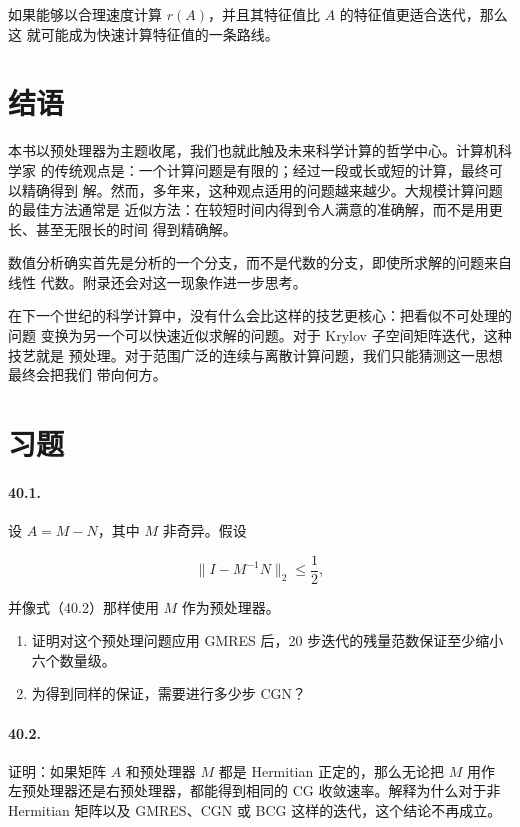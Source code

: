 \documentclass[UTF8,fontset=none,12pt]{ctexart}
\begin{document}
如果能够以合理速度计算 $r(A)$，并且其特征值比 $A$ 的特征值更适合迭代，那么这
就可能成为快速计算特征值的一条路线。

\section*{结语}

本书以预处理器为主题收尾，我们也就此触及未来科学计算的哲学中心。计算机科学家
的传统观点是：一个计算问题是有限的；经过一段或长或短的计算，最终可以精确得到
解。然而，多年来，这种观点适用的问题越来越少。大规模计算问题的最佳方法通常是
近似方法：在较短时间内得到令人满意的准确解，而不是用更长、甚至无限长的时间
得到精确解。

数值分析确实首先是分析的一个分支，而不是代数的分支，即使所求解的问题来自线性
代数。附录还会对这一现象作进一步思考。

在下一个世纪的科学计算中，没有什么会比这样的技艺更核心：把看似不可处理的问题
变换为另一个可以快速近似求解的问题。对于 Krylov 子空间矩阵迭代，这种技艺就是
预处理。对于范围广泛的连续与离散计算问题，我们只能猜测这一思想最终会把我们
带向何方。

\section*{习题}

\paragraph{40.1.}
设 $A=M-N$，其中 $M$ 非奇异。假设

\[
\lVert I-M^{-1}N\rVert_2\leq\frac12,
\]

并像式（40.2）那样使用 $M$ 作为预处理器。

\begin{enumerate}[label=(\alph*)]
\item 证明对这个预处理问题应用 GMRES 后，20 步迭代的残量范数保证至少缩小六个数量级。
\item 为得到同样的保证，需要进行多少步 CGN？
\end{enumerate}

\paragraph{40.2.}
证明：如果矩阵 $A$ 和预处理器 $M$ 都是 Hermitian 正定的，那么无论把 $M$ 用作
左预处理器还是右预处理器，都能得到相同的 CG 收敛速率。解释为什么对于非 Hermitian
矩阵以及 GMRES、CGN 或 BCG 这样的迭代，这个结论不再成立。
\end{document}
